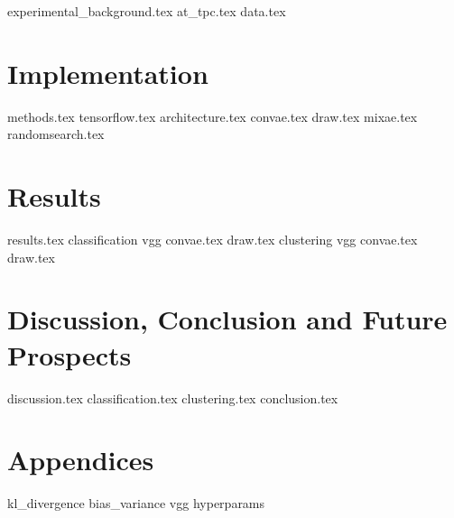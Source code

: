 \documentclass[12pt]{uiofysmaster}
\begin{document}


{experimental_background.tex}
{at_tpc.tex}
{data.tex}


\part{Implementation}\label{part:implement}

{methods.tex}
{tensorflow.tex}
{architecture.tex}
{convae.tex}
{draw.tex}
{mixae.tex}
{randomsearch.tex}

\part{Results}\label{part:results}
{results.tex}
{classification}
{vgg}
{convae.tex}
{draw.tex}
{clustering}
{vgg}
{convae.tex}
{draw.tex}


\part{Discussion, Conclusion and Future Prospects}\label{part:discuss_concludee}
{discussion.tex}
{classification.tex}
{clustering.tex}
{conclusion.tex}

\part{Appendices}
\appendix
{kl_divergence}
{bias_variance}
{vgg}
{hyperparams}

% 
%


\end{document}
